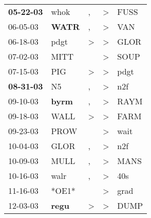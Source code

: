 \begin{supertabular}{p{0.07\textwidth}p{0.06\textwidth}p{0.02\textwidth}p{0.02\textwidth}p{0.06\textwidth}}
 \textbf{05-22-03\textsuperscript{}} &           whok\textsuperscript{} &                , &     \textgreater &           FUSS\textsuperscript{} \\
          06-05-03\textsuperscript{} &  \textbf{WATR\textsuperscript{}} &                , &     \textgreater &            VAN\textsuperscript{} \\
          06-18-03\textsuperscript{} &           pdgt\textsuperscript{} &     \textgreater &     \textgreater &           GLOR\textsuperscript{} \\
          07-02-03\textsuperscript{} &           MITT\textsuperscript{} &                  &     \textgreater &           SOUP\textsuperscript{} \\
          07-15-03\textsuperscript{} &            PIG\textsuperscript{} &     \textgreater &     \textgreater &           pdgt\textsuperscript{} \\
 \textbf{08-31-03\textsuperscript{}} &             N5\textsuperscript{} &                , &     \textgreater &            n2f\textsuperscript{} \\
          09-10-03\textsuperscript{} &  \textbf{byrm\textsuperscript{}} &                , &     \textgreater &           RAYM\textsuperscript{} \\
          09-18-03\textsuperscript{} &           WALL\textsuperscript{} &     \textgreater &     \textgreater &           FARM\textsuperscript{} \\
          09-23-03\textsuperscript{} &           PROW\textsuperscript{} &                  &     \textgreater &           wait\textsuperscript{} \\
          10-04-03\textsuperscript{} &           GLOR\textsuperscript{} &                , &     \textgreater &            n2f\textsuperscript{} \\
          10-09-03\textsuperscript{} &           MULL\textsuperscript{} &                , &     \textgreater &           MANS\textsuperscript{} \\
          10-16-03\textsuperscript{} &           walr\textsuperscript{} &                , &     \textgreater &            40s\textsuperscript{} \\
          11-16-03\textsuperscript{} &                            *OE1* &                  &     \textgreater &           grad\textsuperscript{} \\
          12-03-03\textsuperscript{} &  \textbf{regu\textsuperscript{}} &     \textgreater &     \textgreater &           DUMP\textsuperscript{} \\

\end{supertabular}
